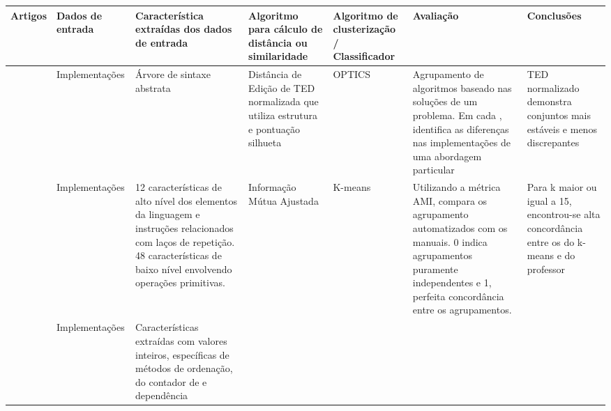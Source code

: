 			\begin{table}[h]
				\tiny
				\begin{tabularx}{\linewidth}{ |X|X|X|X|X|X|X| }
					\hline %
					\textbf{Artigos}
					& \textbf{Dados de entrada}
					& \textbf{Característica extraídas dos dados de entrada}
					& \textbf{Algoritmo para cálculo de distância ou similaridade}
					& \textbf{Algoritmo de clusterização / Classificador}
					& \textbf{Avaliação}
					& \textbf{Conclusões} \\
					\hline %
					\citeonline{Yin:2015,Moghadam:2015:ATC,choudhury2016autostyle}
					& Implementações
					& Árvore de sintaxe abstrata
					& Distância de Edição de \acs{TED} normalizada que utiliza estrutura
					\foreign{top-down} e pontuação silhueta
					& \acs{OPTICS}
					& Agrupamento de algoritmos baseado nas soluções de um problema.
					Em cada \foreign{cluster}, identifica as diferenças nas
					implementações de uma abordagem particular
					& \acs{TED} normalizado demonstra conjuntos mais estáveis e menos discrepantes \\
					\hline %
					\citeonline{Glassman:2014}
					& Implementações
					& 12 características de alto nível dos elementos da linguagem e
					instruções relacionados com laços de repetição. 48 características
					de baixo nível envolvendo operações primitivas.
					& Informação Mútua Ajustada
					& K-means
					& Utilizando a métrica \acs{AMI}, compara os agrupamento automatizados com
					os manuais. 0 indica agrupamentos puramente independentes e 1, perfeita
					concordância entre os agrupamentos.
					& Para k maior ou igual a 15, encontrou-se alta concordância entre os
					\foreign{cluster} do k-means e do professor \\
					\hline %
					\citeonline{Taherkhani:2012}
					& Implementações
					& Características extraídas com valores inteiros, específicas de
					métodos de ordenação, do contador de \foreign{loops} e dependência

\end{tabularx}
\end{table}
